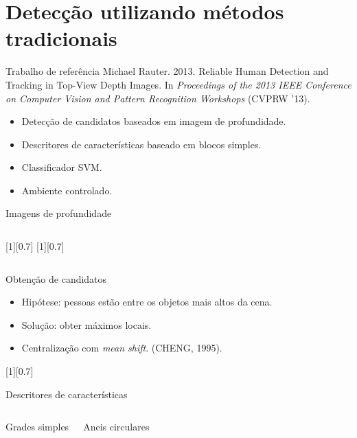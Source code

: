\section{Detecção utilizando métodos tradicionais}

\begin{frame}{Trabalho de referência}
	Michael Rauter. 2013. Reliable Human Detection and Tracking in Top-View Depth Images. In \textit{Proceedings of the 2013 IEEE Conference on Computer Vision and Pattern Recognition Workshops} (CVPRW '13).

	\begin{itemize}
		\item Detecção de candidatos baseados em imagem de profundidade.
		\item Descritores de características baseado em blocos simples.
		\item Classificador SVM.
		\item Ambiente controlado.
	\end{itemize}
\end{frame}

\begin{frame}{Imagens de profundidade}
\begin{columns}[T]
 [1][0.7]
 [1][0.7]
\end{columns}
\end{frame}

\begin{frame}{Obtenção de candidatos}
	\begin{itemize}
	\item Hipótese: pessoas estão entre os objetos mais altos da cena.
	\item Solução: obter máximos locais.
	\item Centralização com \textit{mean shift}. (CHENG, 1995).
	\end{itemize}

	[0.7]
\end{frame}

\begin{frame}{Descritores de características}
	\begin{columns}[T]
		\center Grades simples

		\center Aneis circulares
	\end{columns}
\end{frame}


